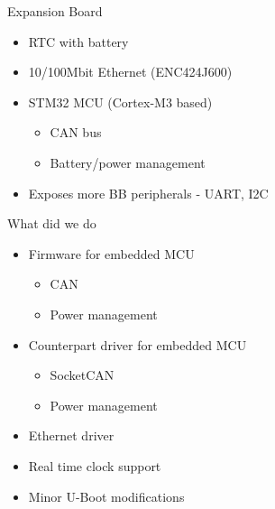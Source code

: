 \documentclass{beamer}
\begin{document}
\begin{frame}{Expansion Board}
\begin{itemize}
	\item RTC with battery
	\item 10/100Mbit Ethernet (ENC424J600)
	\item STM32 MCU (Cortex-M3 based) \begin{itemize}
	\item CAN bus
	\item Battery/power management
\end{itemize}
\item Exposes more BB peripherals - UART, I2C
\end{itemize}
\end{frame}

\begin{frame}{What did we do}

\begin{itemize}
	\item Firmware for embedded MCU
	\begin{itemize}
		\item CAN
		\item Power management
	\end{itemize}
	\item Counterpart driver for embedded MCU 
	\begin{itemize}
		\item SocketCAN
		\item Power management
	\end{itemize}
	\item Ethernet driver
	\item Real time clock support
	\item Minor U-Boot modifications
\end{itemize}

\end{frame}
\end{document}
